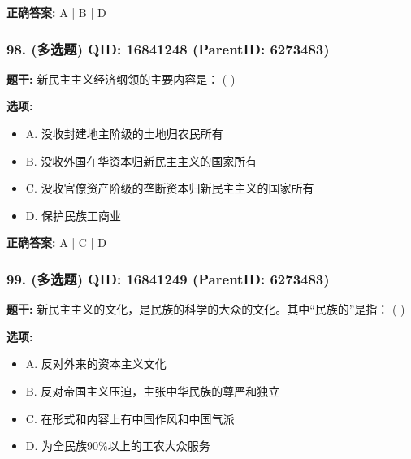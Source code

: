 \documentclass[12pt,UTF8]{ctexart}
\begin{document}
\textbf{正确答案:}
A | B | D

\vspace{0.3em}\hrulefill\vspace{0.7em}

\subsubsection*{98. (多选题) \small QID: 16841248 (ParentID: 6273483)}

\textbf{题干:}
新民主主义经济纲领的主要内容是： ( )



\textbf{选项:}
\begin{itemize}[leftmargin=*]

  \item A. 没收封建地主阶级的土地归农民所有

  \item B. 没收外国在华资本归新民主主义的国家所有

  \item C. 没收官僚资产阶级的垄断资本归新民主主义的国家所有

  \item D. 保护民族工商业

\end{itemize}

\textbf{正确答案:}
A | C | D

\vspace{0.3em}\hrulefill\vspace{0.7em}

\subsubsection*{99. (多选题) \small QID: 16841249 (ParentID: 6273483)}

\textbf{题干:}
新民主主义的文化，是民族的科学的大众的文化。其中“民族的”是指： ( )



\textbf{选项:}
\begin{itemize}[leftmargin=*]

  \item A. 反对外来的资本主义文化

  \item B. 反对帝国主义压迫，主张中华民族的尊严和独立

  \item C. 在形式和内容上有中国作风和中国气派

  \item D. 为全民族90\%以上的工农大众服务

\end{itemize}
\end{document}
